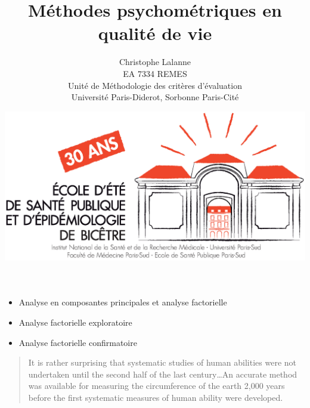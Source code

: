 

\title{Méthodes psychométriques en qualité de vie}
\author{Christophe Lalanne\\EA 7334 REMES\\ Unité de Méthodologie des critères d’évaluation\\Université Paris-Diderot, Sorbonne Paris-Cité\\}
\date{\includegraphics[height=18ex]{logo.eps}}




\LogoOff
\maketitle
\rightfooter{\quad\textsf{\thepage}}



\begin{itemize}
\item Analyse en composantes principales et analyse factorielle
\item Analyse factorielle exploratoire
\item Analyse factorielle confirmatoire
\end{itemize}


\foilhead{}

\begin{quote}
It is rather surprising that systematic studies of human abilities were not undertaken until the second half of the last century\ldots An accurate method was available for measuring the circumference of the earth 2,000 years before the first systematic measures of human ability were developed\autocite{Nunnally1994}.  
\end{quote}


{\centering {}\par}

